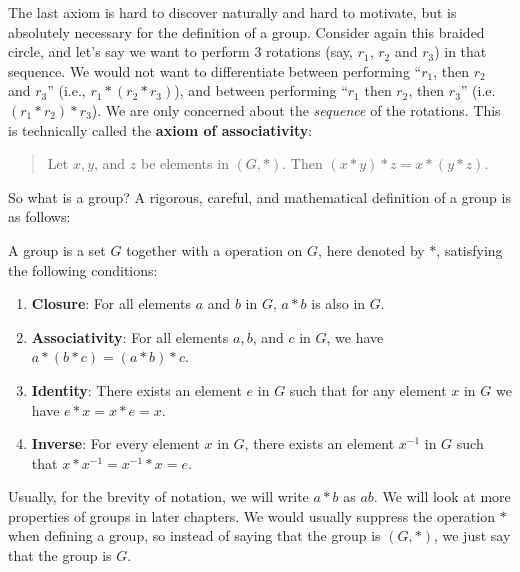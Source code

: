 The last axiom is hard to discover naturally and hard to motivate, but is absolutely necessary for the definition of a group. Consider again this braided circle, and let's say we want to perform 3 rotations (say, $r_1$, $r_2$ and $r_3$) in that sequence. We would not want to differentiate between performing ``$r_1$, then $r_2$ and $r_3$'' (i.e., $r_1 \ast (r_2 \ast r_3)$), and between performing ``$r_1$ then $r_2$, then $r_3$'' (i.e. $(r_1 \ast r_2) \ast r_3$). We are only concerned about the \textit{sequence} of the rotations. This is technically called the \textbf{axiom of associativity}:
\begin{quote}
    Let $x, y$, and $z$ be elements in $(G, \ast)$. Then $(x \ast y) \ast z = x \ast (y \ast z)$.
\end{quote}

So what is a group? A rigorous, careful, and mathematical definition of a group is as follows:
\begin{definition}
    A group is a set $G$ together with a operation on $G$, here denoted by $\ast$, satisfying the following conditions:
    \begin{enumerate}
        \item \textbf{Closure}: For all elements $a$ and $b$ in $G$, $a \ast b$ is also in $G$.
        \item \textbf{Associativity}: For all elements $a, b$, and $c$ in $G$, we have $a \ast (b \ast c) = (a \ast b) \ast c$.
        \item \textbf{Identity}: There exists an element $e$ in $G$ such that for any element $x$ in $G$ we have $e \ast x = x \ast e = x$.
        \item \textbf{Inverse}: For every element $x$ in $G$, there exists an element $x^{-1}$ in $G$ such that $x \ast x^{-1} = x^{-1} \ast x = e$.
    \end{enumerate}
\end{definition}

Usually, for the brevity of notation, we will write $a \ast b$ as $ab$. We will look at more properties of groups in later chapters. We would usually suppress the operation $\ast$ when defining a group, so instead of saying that the group is $(G, \ast)$, we just say that the group is $G$.

\newpage

